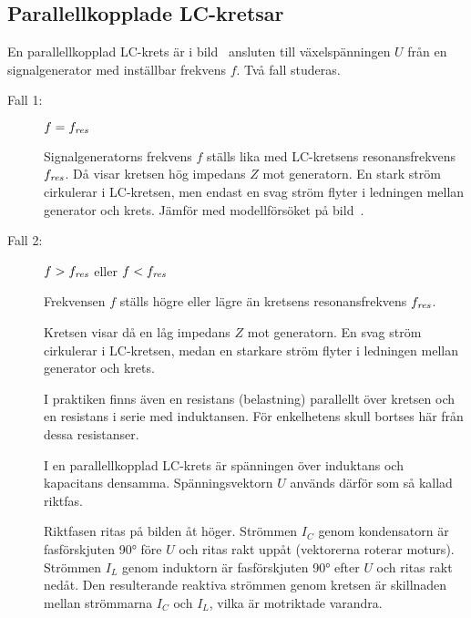 \subsection{Parallellkopplade LC-kretsar}



En parallellkopplad LC-krets är i bild~ ansluten till
växelspänningen \(U\) från en signalgenerator med inställbar frekvens \(f\).
Två fall studeras.

\begin{description}

\item[Fall 1:] \(f = f_{\it res}\)

Signalgeneratorns frekvens \(f\) ställs lika med LC-kretsens resonansfrekvens
\(f_{\it res}\).
Då visar kretsen hög impedans \(Z\) mot generatorn.
En stark ström cirkulerar i LC-kretsen, men endast en svag ström flyter i
ledningen mellan generator och krets.
Jämför med modellförsöket på bild~.

\item[Fall 2:] \(f > f_{\it res}\) eller \(f < f_{\it res}\)

Frekvensen \(f\) ställs högre eller lägre än kretsens resonansfrekvens
\(f_{\it res}\).

Kretsen visar då en låg impedans \(Z\) mot generatorn.
En svag ström cirkulerar i LC-kretsen, medan en starkare ström flyter i
ledningen mellan generator och krets.

I praktiken finns även en resistans (belastning) parallellt över kretsen och en
resistans i serie med induktansen.
För enkelhetens skull bortses här från dessa resistanser.

I en parallellkopplad LC-krets är spänningen över induktans och kapacitans
densamma.
Spänningsvektorn \(U\) används därför som så kallad riktfas.

Riktfasen ritas på bilden åt höger.
Strömmen \(I_C\) genom kondensatorn är fasförskjuten \ang{90} före \(U\) och
ritas rakt uppåt (vektorerna roterar moturs).
Strömmen \(I_L\) genom induktorn är fasförskjuten \ang{90} efter \(U\) och
ritas rakt nedåt.
Den resulterande reaktiva strömmen genom kretsen är skillnaden mellan
strömmarna \(I_C\) och \(I_L\), vilka är motriktade varandra.


\end{description}
